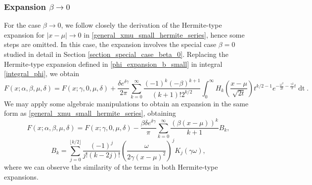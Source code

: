 \documentclass[10pt,a4paper,oneside]{article}
\numberwithin{equation}{section}
\begin{document}
\subsubsection{Expansion $\beta \to 0$} 
For the case $\beta \to 0$, we follow closely the derivation of the Hermite-type expansion for $|x-\mu| \to 0$ in \eqref{general_xmu_small_hermite_series}, hence some steps are omitted. In this case, the expansion involves the special case $\beta = 0$ studied in detail in Section \ref{section_special_case_beta_0}. Replacing the Hermite-type expansion defined in \eqref{phi_expansion_b_small} in integral \eqref{integral_phi}, we obtain
\begin{equation}
F(x; \alpha, \beta, \mu, \delta) = F(x; \gamma, 0, \mu, \delta) + \frac{\delta e^{\delta \gamma}}{2\pi} \sum_{k=0}^{\infty} \frac{(-1)^k (-\beta)^{k+1}}{(k+1)! 2^{k/2}} \int_0^{\infty} H_k\left(\frac{x-\mu}{\sqrt{2t}}\right) t^{k/2 - 1} e^{-\frac{\omega^2}{2t} - \frac{\gamma^2}{2}t} \mathop{dt}.
\end{equation}
We may apply some algebraic manipulations to obtain an expansion in the same form as \eqref{general_xmu_small_hermite_series}, obtaining
\begin{equation}\label{general_beta_small_hermite_series}
F(x; \alpha, \beta, \mu, \delta) = F(x; \gamma, 0, \mu, \delta) -\frac{\beta \delta e^{\delta \gamma}}{\pi}\sum_{k=0}^{\infty} \frac{(\beta(x-\mu))^k}{k+1}B_k,
\end{equation}
\begin{equation}
B_k = \sum_{j=0}^{\lfloor k/2 \rfloor} \frac{(-1)^j}{j!(k - 2j)!} \left(\frac{\omega}{2\gamma (x-\mu)^2}\right)^j K_{j}(\gamma \omega),
\end{equation}
where we can observe the similarity of the terms in both Hermite-type expansions.
\end{document}
